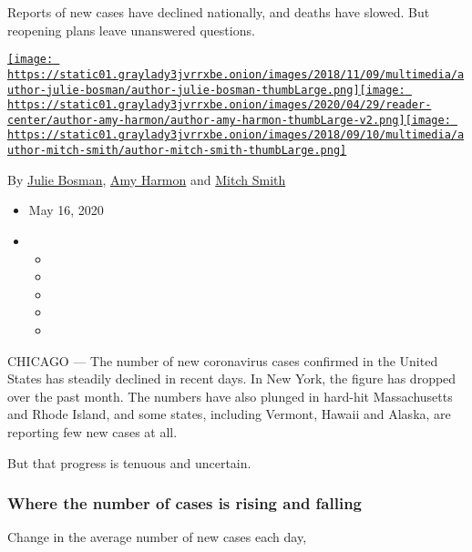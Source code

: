 Reports of new cases have declined nationally, and deaths have slowed.
But reopening plans leave unanswered questions.

\href{https://www.nytimes3xbfgragh.onion/by/julie-bosman}{\texttt{[image: https://static01.graylady3jvrrxbe.onion/images/2018/11/09/multimedia/author-julie-bosman/author-julie-bosman-thumbLarge.png]}}\href{https://www.nytimes3xbfgragh.onion/by/amy-harmon}{\texttt{[image: https://static01.graylady3jvrrxbe.onion/images/2020/04/29/reader-center/author-amy-harmon/author-amy-harmon-thumbLarge-v2.png]}}\href{https://www.nytimes3xbfgragh.onion/by/mitch-smith}{\texttt{[image: https://static01.graylady3jvrrxbe.onion/images/2018/09/10/multimedia/author-mitch-smith/author-mitch-smith-thumbLarge.png]}}

By \href{https://www.nytimes3xbfgragh.onion/by/julie-bosman}{Julie
Bosman}, \href{https://www.nytimes3xbfgragh.onion/by/amy-harmon}{Amy
Harmon} and
\href{https://www.nytimes3xbfgragh.onion/by/mitch-smith}{Mitch Smith}

\begin{itemize}
\item
  May 16, 2020
\item
  \begin{itemize}
  \item
  \item
  \item
  \item
  \item
  \end{itemize}
\end{itemize}

CHICAGO --- The number of new coronavirus cases confirmed in the United
States has steadily declined in recent days. In New York, the figure has
dropped over the past month. The numbers have also plunged in hard-hit
Massachusetts and Rhode Island, and some states, including Vermont,
Hawaii and Alaska, are reporting few new cases at all.

But that progress is tenuous and uncertain.

\hypertarget{where-the-number-of-cases-is-rising-and-falling}{%
\subsubsection{Where the number of cases is rising and
falling}\label{where-the-number-of-cases-is-rising-and-falling}}

Change in the average number of new cases each day,

